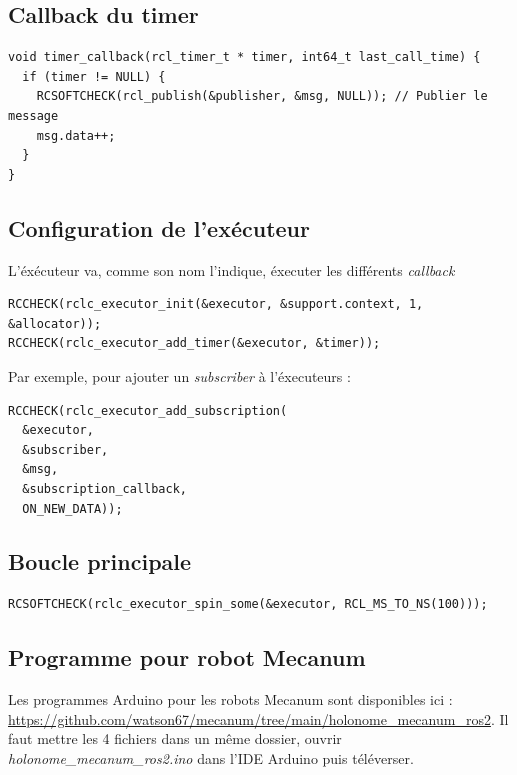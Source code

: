 \subsection{Callback du timer}

\begin{lstlisting}[style=commandstyle]
void timer_callback(rcl_timer_t * timer, int64_t last_call_time) {
  if (timer != NULL) {
    RCSOFTCHECK(rcl_publish(&publisher, &msg, NULL)); // Publier le message
    msg.data++;
  }
}
\end{lstlisting}

\subsection{Configuration de l'exécuteur}

\noindent L'éxécuteur va, comme son nom l'indique, éxecuter les différents \textit{callback}
\begin{lstlisting}[style=commandstyle]
RCCHECK(rclc_executor_init(&executor, &support.context, 1, &allocator));
RCCHECK(rclc_executor_add_timer(&executor, &timer));
\end{lstlisting}

\noindent Par exemple, pour ajouter un \textit{subscriber} à l'éxecuteurs :

\begin{lstlisting}[style=commandstyle]
RCCHECK(rclc_executor_add_subscription(
  &executor,
  &subscriber,
  &msg,
  &subscription_callback,
  ON_NEW_DATA));
\end{lstlisting}

\subsection{Boucle principale}

\begin{lstlisting}[style=commandstyle]
RCSOFTCHECK(rclc_executor_spin_some(&executor, RCL_MS_TO_NS(100)));
\end{lstlisting}

\subsection{Programme pour robot Mecanum}

\noindent Les programmes Arduino pour les robots Mecanum sont disponibles ici : \url{https://github.com/watson67/mecanum/tree/main/holonome_mecanum_ros2}. Il faut mettre les 4 fichiers dans un même dossier, ouvrir \textit{holonome\_mecanum\_ros2.ino} dans l'IDE Arduino puis téléverser.


